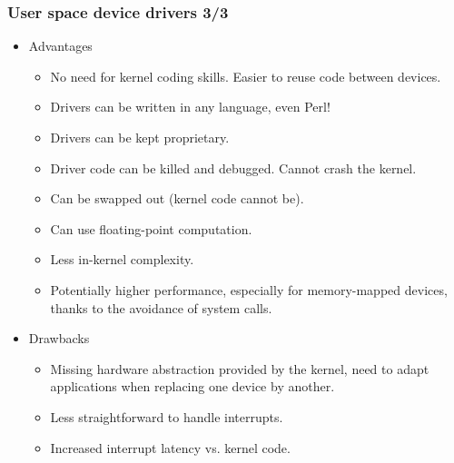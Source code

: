 \begin{frame}
  \frametitle{User space device drivers 3/3}
  \begin{itemize}
  \item Advantages
    \begin{itemize}
    \item No need for kernel coding skills. Easier to reuse code
      between devices.
    \item Drivers can be written in any language, even Perl!
    \item Drivers can be kept proprietary.
    \item Driver code can be killed and debugged. Cannot crash the
      kernel.
    \item Can be swapped out (kernel code cannot be).
    \item Can use floating-point computation.
    \item Less in-kernel complexity.
    \item Potentially higher performance, especially for
      memory-mapped devices, thanks to the avoidance of system calls.
    \end{itemize}
  \item Drawbacks
    \begin{itemize}
    \item Missing hardware abstraction provided by the kernel, need
          to adapt applications when replacing one device by another.
    \item Less straightforward to handle interrupts.
    \item Increased interrupt latency vs. kernel code.
    \end{itemize}
  \end{itemize}
\end{frame}
